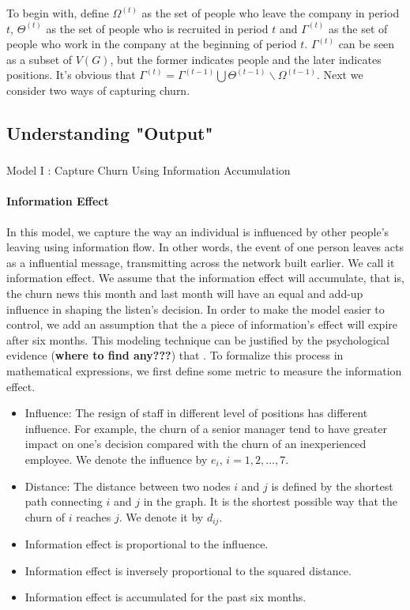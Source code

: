 \documentclass[tcn = 37075, sheet = true, abstract = true]{mcmthesis}
\begin{document}
To begin with, define $\Omega^{(t)}$ as the set of people who leave the company in period $t$, $\Theta^{(t)}$ as the set of people who is recruited in period $t$ and $\Gamma^{(t)}$ as the set of people who work in the company at the beginning of period $t$. $\Gamma^{(t)}$ can be seen as a subset of $V(G)$, but the former indicates people and the later indicates positions. It's obvious that $\Gamma^{(t)}=\Gamma^{(t-1)}\bigcup \Theta ^{(t-1)} \backslash \Omega^{(t-1)}$. Next we consider two ways of capturing churn.

\subsection{Understanding "Output"}
\subsubsection{}{Model I : Capture Churn Using Information Accumulation}

\paragraph{Information Effect}
In this model, we capture the way an individual is influenced by other people's leaving using information flow. In other words, the event of one person leaves acts as a influential message, transmitting across the network built earlier. We call it information effect. We assume that the information effect will accumulate, that is, the churn news this month and last month will have an equal and add-up influence in shaping the listen's decision. In order to make the model easier to control, we add an assumption that the a piece of information's effect will expire after six months. This modeling technique can be justified by the psychological evidence (\textbf{where to find any???}) that . To formalize this process in mathematical expressions, we first define some metric to measure the information effect. 

\begin{itemize}
\item Influence: The resign of staff in different level of positions has different influence. For example, the churn of a senior manager tend to have greater impact on one's decision compared with the churn of an inexperienced employee. We denote the influence by $e_i$, $i=1,2,...,7$.
\item Distance: The distance between two nodes $i$ and $j$ is defined by the shortest path connecting $i$ and $j$ in the graph. It is the shortest possible way that the churn of $i$ reaches $j$. We denote it by $d_{ij}$.
\item Information effect is proportional to the influence.
\item Information effect is inversely proportional to the squared distance.
\item Information effect is accumulated for the past six months.
\end{itemize}
\end{document}

